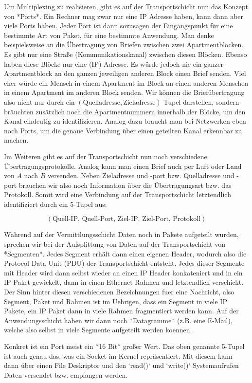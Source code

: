 Um Multiplexing zu realisieren, gibt es auf der Transportschicht nun das Konzept
von *Ports*. Ein Rechner mag zwar nur eine IP Adresse haben, kann dann aber
viele Ports haben. Jeder Port ist dann sozusagen der Eingangspunkt für eine
bestimmte Art von Paket, für eine bestimmte Anwendung. Man denke beispielsweise
an die Übertragung von Briefen zwischen zwei Apartmentblöcken. Es gibt nur eine
Straße (Kommunikationskanal) zwischen diesen Blöcken. Ebenso haben diese Blöcke
nur eine (IP) Adresse. Es würde jedoch nie ein ganzer Apartmentblock an den
ganzen jeweiligen anderen Block einen Brief senden. Viel eher würde ein Mensch
in einem Apartment im Block an einen anderen Menschen in einem Apartment im
anderen Block senden. Wir können die Briefübertragung also nicht nur durch ein
$(\text{Quelladresse}, \text{Zieladresse})$ Tupel darstellen, sondern bräuchten
zusätzlich noch die Apartmentnummern innerhalb der Blöcke, um den Kanal
eindeutig zu identifizieren. Analog dazu braucht man bei Netzwerken eben noch
Ports, um die genaue Verbindung über einen geteilten Kanal erkennbar zu machen.

Im Weiteren gibt es auf der Transportschicht nun noch verschiedene
Übertragungsprotokolle. Analog kann man einen Brief auch per Luft oder Land von
$A$ nach $B$ versenden. Neben Zieladresse und -port bzw. Quelladresse und -port
brauchen wir also noch Information über die Übertragungsart bzw. das
Protokoll. Somit wird eine Verbindung auf der Transportschicht letztendlich
identifiziert durch ein 5-Tupel aus:

$$(\text{Quell-IP, Quell-Port, Ziel-IP, Ziel-Port, Protokoll})$$

Während auf der Vermittlungsschicht Daten noch in Pakete aufgeteilt wurden,
sprechen wir bei der Aufsplittung von Daten auf der Transportschicht von
*Segmenten*. Jedes Segment erhält dann einen eigenen Header, wodurch also die
Protocol Data Unit (PDU) der Transportschicht entsteht. Jedes dieser Segmente
mit Header wird dann selbst wieder an einen IP Header konkateniert und in ein IP
Paket gewickelt, dann in einen Ethernet Rahmen und letztendlich verschickt. Der
Sinn hinter diesen verschiedenen Bezeichnungen fuer eine Nachricht, also
Segment, Paket und Rahmen ist im Uebrigen, dass ein Segment in viele IP Pakete,
ein IP Paket dann in viele Rahmen fragmentiert werden kann. Auf der
Anwendungsschicht haben wir dann noch *Datagramme* (z.B. eine E-Mail), welche
also selbst in viele Segmente aufgeteilt werden koennen.

Konkret ist ein Port meist ein *16 Bit* großer Wert. Das oben genannte 5-Tupel
ist auch genau das, was ein Socket im Kernel repräsentiert. Mit diesem kann dann
über einen File Deskriptor und den `read()` und `write()` Systemaufrufen Daten
versendet bzw. empfangen werden.


